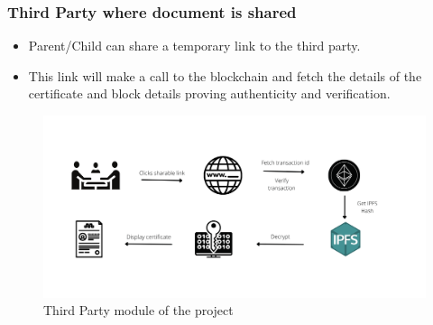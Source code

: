     \subsubsection{Third Party where document is shared}

        \begin{itemize}
            \item Parent/Child can share a temporary link to the third party.
            \item This link will make a call to the blockchain and fetch the details of the certificate and block details proving authenticity and verification.            
        \end{itemize}
    
        \begin{figure}[H]
            \centering
            \includegraphics[width=\textwidth]{imgs/Third_party.png}
            \caption{Third Party module of the project}
            \label{fig:Third Party module of the project}
            \end{figure}